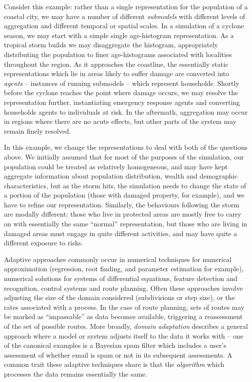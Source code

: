 Consider this example: rather than a single representation for the
population of a coastal city, we may have a number of
different \emph{submodels} with different levels of aggregation and
different temporal or spatial scales.  In a simulation of a cyclone
season, we may start with a simple single age-histogram representation.
As a tropical storm builds we may disaggregate the histogram,
appropriately distributing the population to finer age-histograms
associated with localities throughout the region.  As it approaches
the coastline, the essentially static representations which lie in
areas likely to suffer damage are converted into \emph{agents}  -- 
instances of running submodels -- which represent households.
Shortly before the cyclone reaches the point where damage occurs, we
may resolve the representation further, instantiating emergency
response agents and converting households agents to individuals at
risk.  In the aftermath, aggregation may occur in regions where there
are no acute effects, but other parts of the system may remain finely
resolved.

In this example, we change the representations to deal with both of
the questions above.  We initially assumed that for most of the
purposes of the simulation, our population could be treated as
relatively homogeneous, and may have kept aggregate information about
population distribution, wealth and demographic characteristics, but
as the storm hits, the simulation needs to change the state of a
portion of the population (those with damaged property, for example),
and we have to refine our representation.  Similarly, the behaviours
following the storm are modally different: those who live in protected
areas are mostly free to carry on with essentially the same ``normal''
representation, but those who are living in damaged areas must engage
in quite different activities, and may have quite a different exposure
to risks.

Adaptive approaches commonly occur in numerical techniques for
numerical approximation (regression, root finding, and parameter
estimation for example), numerical solutions for systems of
differential equations, feature detection and recognition, control
systems and route planning.  Often these approaches involve adjusting
the size of the domain considered (subdivisions or step size), or the
rates associated with a process. In the case of route planning, sets
of routes may be marked as ``impassable'' as data becomes available,
triggering a reassessment of the set of possible routes. More
broadly, \emph{domain adaptation} describes a general approach where a
model or system adjusts itself to the data it works with -- one of the
canonical examples is a Bayesian spam filter which includes a user's
assessment of whether email is spam or not in its subsequent
assessments. A common trait these adaptive techniques share is that
the \emph{algorithm} which processes the data remains essentially the
same.

